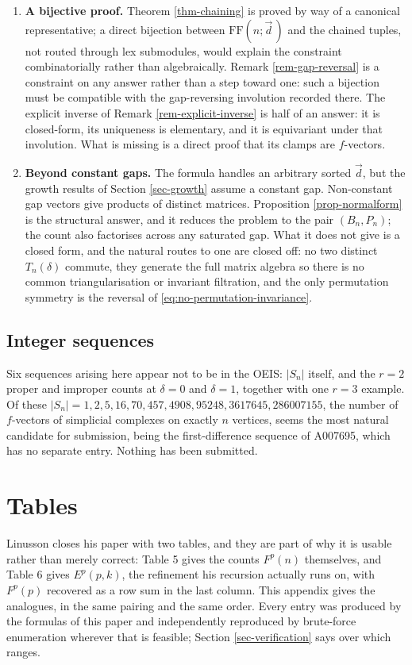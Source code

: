 \documentclass[11pt, a4paper, abstract=yes]{scrartcl}
\theoremstyle{definition}
\theoremstyle{remark}
\theoremstyle{plain}
\begin{document}
\begin{enumerate}
\item \textbf{A bijective proof.} Theorem \ref{thm-chaining} is proved by way of a canonical representative;
a direct bijection between \(\mathrm{FF}(n;\vec d\,)\) and the chained tuples, not routed through lex
submodules, would explain the constraint combinatorially rather than algebraically. Remark
\ref{rem-gap-reversal} is a constraint on any answer rather than a step toward one: such a
bijection must be compatible with the gap-reversing involution recorded there. The explicit
inverse of Remark \ref{rem-explicit-inverse} is half of an answer: it is closed-form, its
uniqueness is elementary, and it is equivariant under that involution. What is missing is a
direct proof that its clamps are \(f\)-vectors.
\item \textbf{Beyond constant gaps.} The formula handles an arbitrary sorted \(\vec d\), but the growth results of
Section \ref{sec-growth} assume a constant gap. Non-constant gap vectors give products of distinct
matrices. Proposition \ref{prop-normalform} is the structural answer, and it reduces the problem
to the pair \((B_n,P_n)\); the count also factorises across any saturated gap. What it does not give
is a closed form, and the natural routes to one are closed off: no two distinct \(T_n(\delta)\)
commute, they generate the full matrix algebra so there is no common triangularisation or
invariant filtration, and the only permutation symmetry is the reversal of
\eqref{eq:no-permutation-invariance}.
\end{enumerate}
\subsection{Integer sequences}
\label{sec:org0912040}

Six sequences arising here appear not to be in the OEIS: \(|S_n|\) itself, and the \(r=2\)
proper and improper counts at \(\delta=0\) and \(\delta=1\), together with one \(r=3\) example. Of
these \(|S_n|=1,2,5,16,70,457,4908,95248,3617645,286007155\), the number of \(f\)-vectors of
simplicial complexes on exactly \(n\) vertices, seems the most natural candidate for submission,
being the first-difference sequence of A007695, which has no separate entry. Nothing has been
submitted.

\appendix
\section{Tables}
\label{sec-app-tables}
\label{sec:app-tables}
Linusson closes his paper with two tables, and they are part of why it is usable rather than
merely correct: Table 5 gives the counts \(F^p(n)\) themselves, and Table 6 gives \(E^p(p,k)\),
the refinement his recursion actually runs on, with \(F^p(p)\) recovered as a row sum in the last
column. This appendix gives the analogues, in the same pairing and the same order. Every entry
was produced by the formulas of this paper and independently reproduced by brute-force
enumeration wherever that is feasible; Section \ref{sec-verification} says over which ranges.
\end{document}
